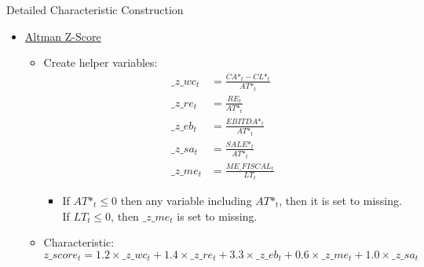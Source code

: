 \documentclass[12pt,title,fleqn]{article}
\begin{document}
\begin{section}{Detailed Characteristic Construction}
\begin{itemize}
\begin{itemize}
                \item Characteristic:
                \begin{align*}
                    o\_score_t =& -1.32 - 0.407 \times \_o\_lat_t + 6.03 \times \_o\_lev_t - 1.43 \times \_o\_wc_t + \\ &0.076 \times \_o\_cacl_t - 1.72 \times \_o\_neg\_eq_t - 2.37 \times \_o\_roe_t - \\ &1.83 \times \_o\_ffo_t + 0.285 \times \_o\_neg\_earn_t - 0.52 \times \_o\_nich_t
                \end{align*}
            \end{itemize}
            
        \item \hyperlink{alt2}{\hypertarget{alt}{Altman Z-Score}}
            \begin{itemize}
                \item Create helper variables:
                    \begin{align*}
                        \_z\_wc_t &= \frac{CA\mbox{*}_t - CL\mbox{*}_t}{AT\mbox{*}_t} \\
                        \_z\_re_t &= \frac{RE_t}{AT\mbox{*}_t} \\
                        \_z\_eb_t &= \frac{EBITDA\mbox{*}_t}{AT\mbox{*}_t} \\
                        \_z\_sa_t &= \frac{SALE\mbox{*}_t}{AT\mbox{*}_t} \\
                        \_z\_me_t &= \frac{ME\_FISCAL_t}{LT_t}
                    \end{align*}
                
                    \begin{itemize}
                        \item If $AT\mbox{*}_t \leq 0$ then any variable including $AT\mbox{*}_t$, then it is set to missing. If $LT_t \leq 0$, then $\_z\_me_t$ is set to missing. 
                    \end{itemize}
                
                \item Characteristic: 
                    \begin{equation*}
                        z\_score_t = 1.2 \times \_z\_wc_t + 1.4 \times \_z\_re_t + 3.3 \times \_z\_eb_t + 0.6 \times \_z\_me_t + 1.0 \times \_z\_sa_t
                    \end{equation*}
            \end{itemize}


\end{itemize}
\end{section}
\end{document}
